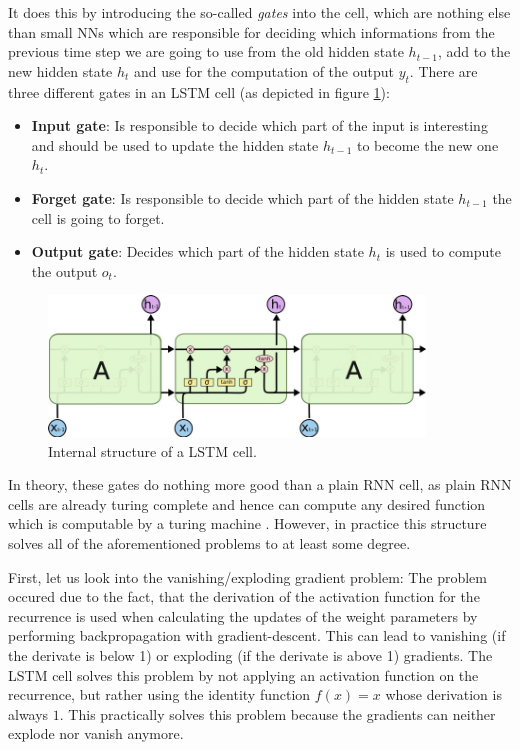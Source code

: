 It does this by introducing the so-called \emph{gates} into the cell, which are nothing else than small NNs which are responsible for deciding which informations from the previous time step we are going to use from the old hidden state $h_{t-1}$, add to the new hidden state $h_t$ and use for the computation of the output $y_t$. There are three different gates in an LSTM cell (as depicted in figure \ref{fundamentals:lstm:internal_structure}):

\begin{itemize}
	\item \textbf{Input gate}: Is responsible to decide which part of the input is interesting and should be used to update the hidden state $h_{t-1}$ to become the new one $h_t$.
	\item \textbf{Forget gate}: Is responsible to decide which part of the hidden state $h_{t-1}$ the cell is going to forget.
	\item \textbf{Output gate}: Decides which part of the hidden state $h_t$ is used to compute the output $o_t$.
\end{itemize}

\begin{figure}[h]
	\label{fundamentals:lstm:internal_structure}
	\centering
	\includegraphics[width=10cm]{img/lstm_internal}
	\caption{Internal structure of a LSTM cell.\protect\footnotemark}
\end{figure}

In theory, these gates do nothing more good than a plain RNN cell, as plain RNN cells are already turing complete and hence can compute any desired function which is computable by a turing machine \cite{Siegelmann:1995}. However, in practice this structure solves all of the aforementioned problems to at least some degree.

First, let us look into the vanishing/exploding gradient problem: The problem occured due to the fact, that the derivation of the activation function for the recurrence is used when calculating the updates of the weight parameters by performing backpropagation with gradient-descent. This can lead to vanishing (if the derivate is below 1) or exploding (if the derivate is above 1) gradients. The LSTM cell solves this problem by not applying an activation function on the recurrence, but rather using the identity function $f(x) = x$ whose derivation is always $1$. This practically solves this problem because the gradients can neither explode nor vanish anymore.

